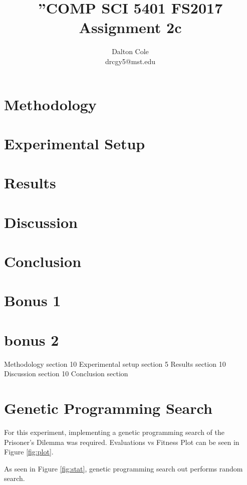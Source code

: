 \documentclass[times]{article}
\begin{document}
	\title{”COMP SCI 5401 FS2017 Assignment 2c}
	\author{Dalton Cole \\ drcgy5@mst.edu}
	\date{}
	\maketitle

	\section{Methodology}

	\section{Experimental Setup}

	\section{Results}

	\section{Discussion}

	\section{Conclusion}

	\section{Bonus 1}

	\section{bonus 2}

	Methodology section 10
Experimental setup section 5
Results section 10
Discussion section 10
Conclusion section 

	\section{Genetic Programming Search}
	For this experiment, implementing a genetic programming search of the Prisoner's Dilemma was required. Evaluations vs Fitness Plot can be seen in Figure \ref{fig:plot}.

	As seen in Figure \ref{fig:stat}, genetic programming search out performs random search.
\end{document}
